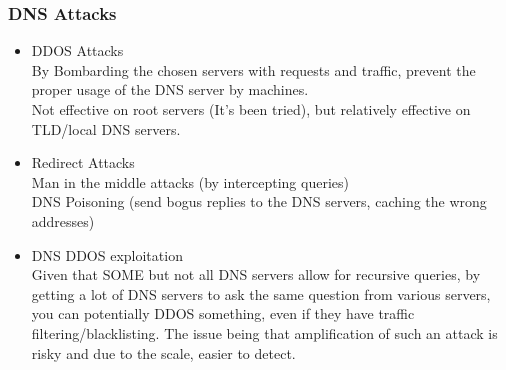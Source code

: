 \documentclass{article}
\begin{document}
\subsubsection{DNS Attacks}
\begin{itemize}
    \item DDOS Attacks\\
    By Bombarding the chosen servers with requests and traffic, prevent the proper usage of the DNS server by machines.\\
    Not effective on root servers (It's been tried), but relatively effective on TLD/local DNS servers. 
    \item Redirect Attacks\\
    Man in the middle attacks (by intercepting queries) \\
    DNS Poisoning (send bogus replies to the DNS servers, caching the wrong addresses)\\
    \item DNS DDOS exploitation\\
    Given that SOME but not all DNS servers allow for recursive queries, by getting a lot of DNS servers to ask the same question from various servers, you can potentially DDOS something, even if they have traffic filtering/blacklisting. The issue being that amplification of such an attack is risky and due to the scale, easier to detect.\\
\end{itemize}
\end{document}
